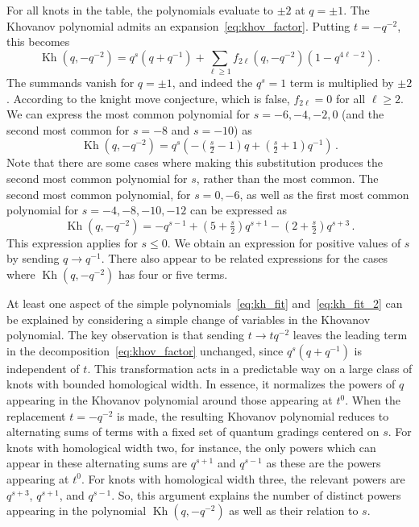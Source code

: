 \documentclass[11pt]{article}
\DeclareMathOperator{\Kh}{Kh}
\numberwithin{equation}{section}
\begin{document}
For all knots in the table, the polynomials evaluate to $\pm 2$ at $q = \pm 1$.
The Khovanov polynomial admits an expansion~\eqref{eq:khov_factor}.
Putting $t=-q^{-2}$, this becomes
    \begin{equation}
        \Kh(q,-q^{-2}) = q^s(q+q^{-1}) + \sum_{\ell\ge 1} f_{2\ell}(q,-q^{-2})(1-q^{4\ell-2}) \,.
    \end{equation}
The summands vanish for $q=\pm 1$, and indeed the $q^s=1$ term is multiplied by $\pm 2$.
According to the knight move conjecture, which is false, $f_{2\ell} = 0$ for all $\ell\ge 2$.
We can express the most common polynomial for $s =-6, -4, -2, 0$ (and the second most common for $s=-8$ and $s=-10$) as 
\begin{equation}
  \Kh(q,-q^{-2}) = q^s\left( -\left(\tfrac{s}{2}-1\right)q + \left(\tfrac{s}{2}+1\right)q^{-1} \right) \,.
    \label{eq:kh_fit}
\end{equation}
Note that there are some cases where making this substitution produces the second most common polynomial for $s$, rather than the most common.
The second most common polynomial, for $s = 0, -6$, as well as the first most common polynomial for $s = -4, -8, -10, -12$ can be expressed as 
\begin{equation}
    \Kh(q,-q^{-2}) = -q^{s - 1} + \left(5 + \tfrac{s}{2}\right) q^{s + 1} - \left(2 + \tfrac{s}{2}\right) q^{s + 3} \,.
    \label{eq:kh_fit_2}
\end{equation}
This expression applies for $s\le 0$.
We obtain an expression for positive values of $s$ by sending $q \to q^{-1}$.
There also appear to be related expressions for the cases where $\Kh(q,-q^{-2})$ has four or five terms.


At least one aspect of the simple polynomials~\eqref{eq:kh_fit} and~\eqref{eq:kh_fit_2} can be explained by considering a simple change of variables in the Khovanov polynomial.
The key observation is that sending $t \to tq^{-2}$ leaves the leading term in the decomposition~\eqref{eq:khov_factor} unchanged, since $q^s(q+q^{-1})$ is independent of $t$.
This transformation acts in a predictable way on a large class of knots with bounded homological width.
In essence, it normalizes the powers of $q$ appearing in the Khovanov polynomial around those appearing at $t^0$.
When the replacement $t = -q^{-2}$ is made, the resulting Khovanov polynomial reduces to alternating sums of terms with a fixed set of quantum gradings centered on $s$.
For knots with homological width two, for instance, the only powers which can appear in these alternating sums are $q^{s+1}$ and $q^{s-1}$ as these are the powers appearing at $t^0$.
For knots with homological width three, the relevant powers are $q^{s+3}$, $q^{s+1}$, and $q^{s-1}$.
So, this argument explains the number of distinct powers appearing in the polynomial $\Kh(q,-q^{-2})$ as well as their relation to $s$.
\end{document}
